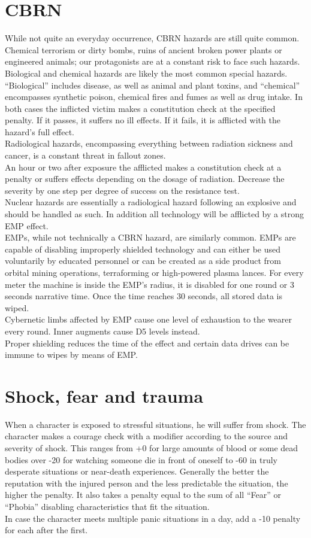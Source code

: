 \documentclass[12pt,a4paper,openany]{book}
\begin{document}
	\section{CBRN}
	While not quite an everyday occurrence, CBRN hazards are still quite common. Chemical terrorism or dirty bombs, ruins of ancient broken power plants or engineered animals; our protagonists are at a constant risk to face such hazards.\\
	Biological and chemical hazards are likely the most common special hazards. “Biological” includes disease, as well as animal and plant toxins, and “chemical” encompasses synthetic poison, chemical fires and fumes as well as drug intake. In both cases the inflicted victim makes a constitution check at the specified penalty. If it passes, it suffers no ill effects. If it fails, it is afflicted with the hazard’s full effect.\\
	Radiological hazards, encompassing everything between radiation sickness and cancer, is a constant threat in fallout zones.\\
	An hour or two after exposure the afflicted makes a constitution check at a penalty or suffers effects depending on the dosage of radiation. Decrease the severity by one step per degree of success on the resistance test.\\
	Nuclear hazards are essentially a radiological hazard following an explosive and should be handled as such. In addition all technology will be afflicted by a strong EMP effect.\\
	EMPs, while not technically a CBRN hazard, are similarly common. EMPs are capable of disabling improperly shielded technology and can either be used voluntarily by educated personnel or can be created as a side product from orbital mining operations, terraforming or high-powered plasma lances. For every meter the machine is inside the EMP’s radius, it is disabled for one round or 3 seconds narrative time. Once the time reaches 30 seconds, all stored data is wiped.\\
	Cybernetic limbs affected by EMP cause one level of exhaustion to the wearer every round. Inner augments cause D5 levels instead.\\
	Proper shielding reduces the time of the effect and certain data drives can be immune to wipes by means of EMP.
	\section{Shock, fear and trauma}
	When a character is exposed to stressful situations, he will suffer from shock. The character makes a courage check with a modifier according to the source and severity of shock. This ranges from +0 for large amounts of blood or some dead bodies over -20 for watching someone die in front of oneself to -60 in truly desperate situations or near-death experiences. Generally the better the reputation with the injured person and the less predictable the situation, the higher the penalty. It also takes a penalty equal to the sum of all “Fear” or “Phobia” disabling characteristics that fit the situation.\\
	In case the character meets multiple panic situations in a day, add a -10 penalty for each after the first.
\end{document}
